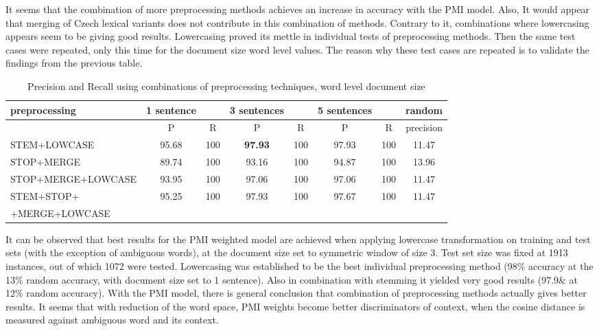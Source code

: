 It seems that the combination of more preprocessing methods achieves an increase in accuracy with the PMI model. Also, It would appear that merging of Czech lexical variants does not contribute in this combination of 
methods. Contrary to it, combinations where lowercasing appears seem to be giving good results. Lowercasing proved its mettle in individual tests of preprocessing methods.  
Then the same test cases were repeated, only this time for the document size word level values. The reason why 
these test cases are repeated is to validate the findings from the previous table. 

 \begin{table}[h!]
\begin{footnotesize}
\begin{tabular}{ l | c c | c c | c c | c}
   preprocessing &  1 sentence && 3 sentences && 5 sentences  && random\\
\hline
	& P  &  R & P  &  R & P  &  R & precision\\
\hline\hline
STEM+LOWCASE  & 95.68 & 100 & \textbf{97.93} & 100 & 97.93 & 100 & 11.47\\
STOP+MERGE  & 89.74 & 100 & 93.16 & 100 & 94.87 & 100 & 13.96 \\
STOP+MERGE+LOWCASE  & 93.95 & 100 & 97.06 & 100 & 97.06 & 100 & 11.47\\
STEM+STOP+ & 95.25 & 100 & 97.93 & 100 & 97.67 & 100 & 11.47 \\
+MERGE+LOWCASE  &&&&&&&\\
\end{tabular}
\caption{Precision and Recall using combinations of preprocessing techniques, word level document size}
\end{footnotesize}
\end{table}


It can be observed that best results for the PMI weighted model are achieved when applying lowercase 
transformation on training and test sets (with the exception of ambiguous words), at the document size set to 
symmetric window of size 3. Test set size was fixed at 1913 instances, out of which 1072 were tested. 
Lowercasing was established to be the best individual preprocessing method (98\% accuracy at the 13\% random 
accuracy, with document size set to 1 sentence). Also in combination with stemming it yielded very good results 
(97.9\& at 12\% random accuracy). With the PMI model, there is general conclusion that combination of 
preprocessing methods actually gives better results. It seems that with reduction of the word space, PMI weights 
become better discriminators of context, when the cosine distance is measured against ambiguous word and its 
context.  

